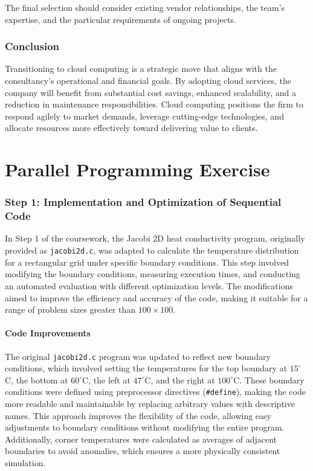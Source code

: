 \documentclass{article}
\begin{document}
\begin{callout}
The final selection should consider existing vendor relationships, the team's expertise, and the particular requirements of ongoing projects.
\end{callout}

\section{Conclusion}

Transitioning to cloud computing is a strategic move that aligns with the consultancy's operational and financial goals. By adopting cloud services, the company will benefit from substantial cost savings, enhanced scalability, and a reduction in maintenance responsibilities. Cloud computing positions the firm to respond agilely to market demands, leverage cutting-edge technologies, and allocate resources more effectively toward delivering value to clients.

\newpage

\part{Parallel Programming Exercise}

\section{Step 1: Implementation and Optimization of Sequential Code}

In Step 1 of the coursework, the Jacobi 2D heat conductivity program, originally provided as \texttt{jacobi2d.c}, was adapted to calculate the temperature distribution for a rectangular grid under specific boundary conditions. This step involved modifying the boundary conditions, measuring execution times, and conducting an automated evaluation with different optimization levels. The modifications aimed to improve the efficiency and accuracy of the code, making it suitable for a range of problem sizes greater than $100\times100$.

\subsection{Code Improvements}

The original \texttt{jacobi2d.c} program was updated to reflect new boundary conditions, which involved setting the temperatures for the top boundary at $15^\circ$C, the bottom at $60^\circ$C, the left at $47^\circ$C, and the right at $100^\circ$C. These boundary conditions were defined using preprocessor directives (\texttt{\#define}), making the code more readable and maintainable by replacing arbitrary values with descriptive names. This approach improves the flexibility of the code, allowing easy adjustments to boundary conditions without modifying the entire program. Additionally, corner temperatures were calculated as averages of adjacent boundaries to avoid anomalies, which ensures a more physically consistent simulation.
\end{document}
